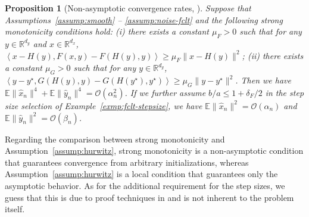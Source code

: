 \documentclass[11pt]{article}
\theoremstyle{plain}
\newtheorem{prop}{Proposition}[section]
\theoremstyle{definition}
\def\Fsmooth{{\delta_F}}
\def\OM{{\mathcal O}}
\def\RB{{\mathbb R}}
\def\EB{{\mathbb E}}
\newcommand{\xhat}{{\hat{x}}}
\newcommand{\yhat}{{\hat{y}}}
\begin{document}
\begin{appendix}
\begin{prop}[Non-asymptotic convergence rates, {\cite[Theorem~3.1]{han2024finite}}]\label{prop:mart-decouple-rate-formal}
Suppose that Assumptions~\ref{assump:smooth} -- \ref{assump:noise-fclt} and the following strong monotonicity conditions hold:
(i) there exists a constant $\mu_{F} > 0$ such that for any $y \in \RB^{d_y}$ and $x \in \RB^{d_x}$, 
    $\left\langle x - H(y), F(x,y) - F(H(y),y) \right\rangle \geq \mu_{F} \|x-H(y)\|^2$;
(ii) there exists a constant $\mu_{G} > 0$ such that for any $ y\in\RB^{d_y}$,
    $\left\langle y - y^{\star}, G(H(y),y) - G(H(y^\star), y^\star) \right\rangle \geq \mu_{G} \|y - y^{\star}\|^2$.
Then we have $\EB \| \xhat_{n} \|^4 + \EB \| \yhat_{n} \|^4 = \OM (\alpha_{n}^2)$.
If we further assume $b/a \le 1 + \Fsmooth/2$ in the step size selection of Example~\ref{exmp:fclt-stepsize}, we have $\EB \| \xhat_{n} \|^2 = \OM(\alpha_{n}) $ and $\EB \| \yhat_{n} \|^2 = \OM(\beta_{n})$.
\end{prop}
Regarding the comparison between strong monotonicity and Assumption~\ref{assump:hurwitz}, strong monotonicity is a non-asymptotic condition that guarantees convergence from arbitrary initializations, whereas Assumption~\ref{assump:hurwitz} is a local condition that guarantees only the asymptotic behavior.
As for the additional requirement for the step sizes, we guess that this is due to proof techniques in \cite{han2024finite} and is not inherent to the problem itself.



\end{appendix}
\end{document}
